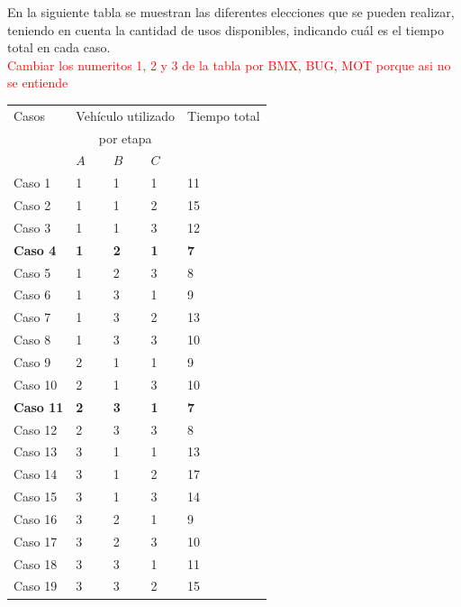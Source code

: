 \newpage

En la siguiente tabla se muestran las diferentes elecciones que se pueden realizar,
teniendo en cuenta la cantidad de usos disponibles, indicando cu\'al es el tiempo total en cada caso.\\

\textcolor{red}{Cambiar los numeritos 1, 2 y 3 de la tabla por BMX, BUG, MOT  porque asi no se entiende}

\begin{table}[htb]
\centering
\begin{tabular}[c]{|l|l|l|l|l|}

		\hline
		Casos &\multicolumn{3}{|c|}{Veh\'iculo utilizado}& Tiempo total \\
		&\multicolumn{3}{|c|}{por etapa}&   \\
		\cline{2-4}
		&  $A$  &  $B$  &  $C$ &  \\
		\hline
		Caso 1& 1 & 1 & 1 & 11 \\
		\hline
		Caso 2& 1 & 1 & 2 & 15 \\
		\hline
		Caso 3& 1 & 1 & 3 & 12 \\
		\hline
		\textbf{Caso 4}& \textbf{1} & \textbf{2} & \textbf{1} & \textbf{7} \\
		\hline
		Caso 5& 1 & 2 & 3 & 8 \\
		\hline		
		Caso 6& 1 & 3 & 1 & 9 \\
		\hline
		Caso 7& 1 & 3 & 2 & 13 \\
		\hline
		Caso 8& 1 & 3 & 3 & 10 \\
		\hline
		Caso 9& 2 & 1 & 1 & 9\\
		\hline
		Caso 10& 2 & 1 & 3 & 10 \\
		\hline
		\textbf{Caso 11}& \textbf{2} & \textbf{3} & \textbf{1} & \textbf{7} \\
		\hline
		Caso 12& 2 & 3 & 3 & 8 \\
		\hline
		Caso 13& 3 & 1 & 1 & 13 \\
		\hline
		Caso 14& 3 & 1 & 2 & 17 \\
		\hline
		Caso 15& 3 & 1 & 3 & 14 \\
		\hline
		Caso 16& 3 & 2 & 1 & 9 \\
		\hline
		Caso 17& 3 & 2 & 3 & 10 \\
		\hline
		Caso 18& 3 & 3 & 1 & 11 \\
		\hline
		Caso 19& 3 & 3 & 2 & 15 \\
		\hline
		
	\end{tabular}
\end{table}

